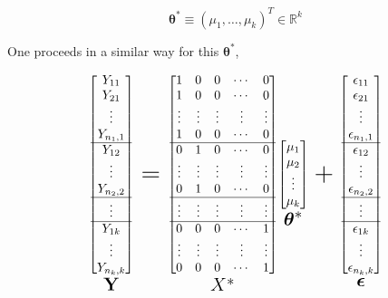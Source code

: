 \documentclass[]{book}
\newcommand{\E}{\boldsymbol\epsilon}
\theoremstyle{definition}
\theoremstyle{definition}
\theoremstyle{definition}
\theoremstyle{remark}
\begin{document}
\[\boldsymbol\theta^{\ast} \equiv (\mu_1, \ldots, \mu_k)^T \in \mathbb{R}^k\]

One proceeds in a similar way for this \(\boldsymbol\theta^{\ast}\),

\[
\underset{\huge \mathbf{Y}}{\begin{bmatrix}
  Y_{11} \\
  Y_{21} \\
  \vdots \\
  Y_{n_1, 1} \\ \hline
  Y_{12} \\
  \vdots \\
  Y_{n_2, 2} \\ \hline
  \vdots \\ \hline
  Y_{1k} \\
  \vdots \\
  Y_{n_k, k}
\end{bmatrix}} = \underset{\huge X^{\ast}}{\begin{bmatrix}
  1 & 0 & 0 & \cdots & 0 \\
  1 & 0 & 0 & \cdots & 0 \\
  \vdots & \vdots & \vdots & \vdots & \vdots \\
  1 & 0 & 0 & \cdots & 0 \\ \hline
  0 & 1 & 0 & \cdots & 0 \\
  \vdots & \vdots & \vdots & \vdots & \vdots \\
  0 & 1 & 0 & \cdots & 0 \\ \hline
  \vdots & \vdots & \vdots & \vdots & \vdots \\ \hline
  0 & 0 & 0 & \cdots & 1 \\
  \vdots & \vdots & \vdots & \vdots & \vdots \\
  0 & 0 & 0 & \cdots & 1
\end{bmatrix}} \underset{\huge \boldsymbol\theta^{\ast}}{\begin{bmatrix}
  \mu_1 \\
  \mu_2 \\
  \vdots \\
  \mu_k
\end{bmatrix}} + \underset{\huge \E}{\begin{bmatrix}
  \epsilon_{11} \\
  \epsilon_{21} \\
  \vdots \\
  \epsilon_{n_1, 1} \\ \hline
  \epsilon_{12} \\
  \vdots \\
  \epsilon_{n_2, 2} \\ \hline
  \vdots \\ \hline
  \epsilon_{1k} \\
  \vdots \\
  \epsilon_{n_k,k}
\end{bmatrix}}
\]
\end{document}
